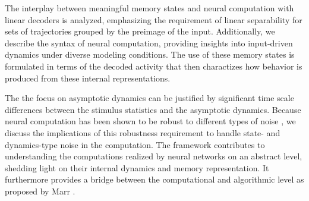\documentclass[12pt,letterpaper, onecolumn]{article}
\theoremstyle{definition}
\theoremstyle{remark}
\begin{document}
 The interplay between meaningful memory states and neural computation with linear decoders is analyzed, emphasizing the requirement of linear separability for sets of trajectories grouped by the preimage of the input. 
Additionally, we describe the syntax of neural computation, providing insights into input-driven dynamics under diverse modeling conditions.
The use of these memory states is formulated in terms of the decoded activity that then charactizes how behavior is produced from these internal representations. 


The the focus on asymptotic dynamics can be justified by significant time scale differences between the stimulus statistics and the asymptotic dynamics.
Because neural computation has been shown to be robust to different types of noise \cite{Park2023a}, we discuss the implications of this robustness requirement to handle state- and dynamics-type noise in the computation. 
The framework contributes to understanding the computations realized by neural networks on an abstract level, shedding light on their internal dynamics and memory representation.
It furthermore provides a bridge between the computational and algorithmic level as proposed by Marr \cite{marr2010}.







\printbibliography
\end{document}
